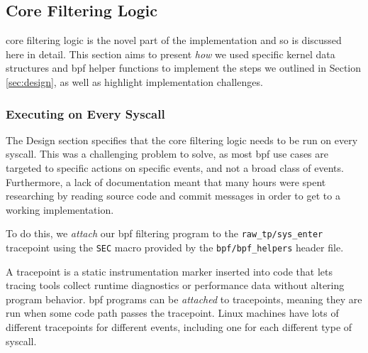 \subsection{Core Filtering Logic}

\afg core filtering logic is the novel part of the implementation and so is
discussed here in detail. This section aims to present \textit{how} we used
specific kernel data structures and \ac{bpf} helper functions to implement the
steps we outlined in Section \ref{sec:design}, as well as highlight
implementation challenges.

\subsubsection{Executing on Every Syscall}

The Design section specifies that the core filtering logic needs to be run on
every syscall. This was a challenging problem to solve, as most \ac{bpf}
use cases are targeted to specific actions on specific events, and not a broad
class of events. Furthermore, a lack of documentation meant that many hours were
spent researching by reading source code and commit messages in order to get to
a working implementation.

To do this, we \textit{attach} our \ac{bpf} filtering program to
the \texttt{raw\_tp/sys\_enter} tracepoint using the \texttt{SEC} macro provided
by the \texttt{bpf/bpf\_helpers} header file.

A tracepoint is a static instrumentation marker inserted into code that lets tracing 
tools collect runtime diagnostics or performance data without altering program 
behavior. \ac{bpf} programs can be \textit{attached} to tracepoints, meaning they 
are run when some code path passes the tracepoint. Linux machines have lots of 
different tracepoints for different events, including one for each different type of 
syscall. 

